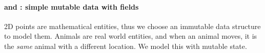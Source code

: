 %

%
%

\paragraph{\Q@Animal@ and \Q@Horse@: simple mutable data with fields}
2D points are mathematical entities, thus we choose an immutable data structure to
model them. Animals are real world entities, and when an animal moves,
it is the \emph{same} animal with a different location. We model this with
mutable state.


